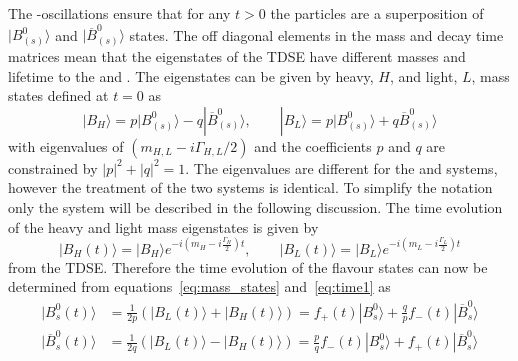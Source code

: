 {The \bsd-\barbsd oscillations ensure that for any $t>0$ the particles are a superposition of $| B^0_{(s)} \rangle$ and $| \overline{B}^0_{(s)} \rangle$ states. The off diagonal elements in the mass and decay time matrices mean that the eigenstates of the TDSE have different masses and lifetime to the \bsd and \barbsd. The eigenstates can be given by heavy, $H$, and light, $L$, mass states defined at $t=0$ as
\begin{equation}
| B_H \rangle = p | B^0_{(s)} \rangle - q |\overline{B}^0_{(s)} \rangle, \qquad |B_L \rangle = p  | B^0_{(s)} \rangle + q \overline{B}^0_{(s)} \rangle
\label{eq:mass_states}
\end{equation}
with eigenvalues of $(m_{H,L} - i\Gamma_{H,L}/2)$ and the coefficients $p$ and $q$ are constrained by $|p|^2 + |q|^2 = 1$. The eigenvalues are different for the \bd and \bs systems, however the treatment of the two systems is identical. To simplify the notation only the \bs system will be described in the following discussion.
The time evolution of the heavy and light mass eigenstates is given by
\begin{equation}
  | B_H (t)\rangle = | B_H \rangle e^{-i(m_H - i\frac{\Gamma_H}{2})t}, \qquad | B_L (t)\rangle = | B_L \rangle e^{-i(m_L - i\frac{\Gamma_L}{2})t}
\label{eq:time1}
\end{equation}
from the TDSE. Therefore the time evolution of the flavour states can now be determined from equations~\ref{eq:mass_states} and~\ref{eq:time1} as
\begin{align}
| B^{0}_{s}(t) \rangle &= \frac{1}{2p}\left(|B_{L}(t)\rangle + |B_{H}(t) \rangle \right)  = f_{+}(t) |B^{0}_{s} \rangle + \frac{q}{p}f_{-}(t) |\overline{B}^{0}_{s}\rangle  \label{eq:AAA}\\
| \overline{B}^{0}_{s}(t) \rangle &= \frac{1}{2q}\left(|B_{L}(t)\rangle - |B_{H}(t) \rangle \right)  = \frac{p}{q}f_{-}(t) |B^{0}_{s} \rangle+ f_{+}(t) |\overline{B}^{0}_{s}\rangle \label{eq:BBB}
\end{align}

}
